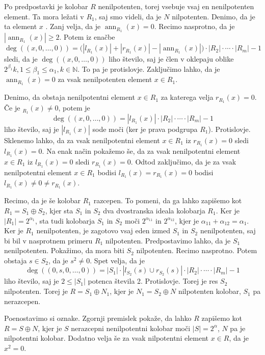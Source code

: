 \documentclass[a4paper, 12pt]{amsart}
\theoremstyle{definition} %
\theoremstyle{plain} %
\newcommand{\N}{\mathbb N}
\DeclareMathOperator{\ann}{ann}
\begin{document}
Po predpostavki je kolobar $R$ nenilpotenten, torej vsebuje vsaj en nenilpotenten element. Ta mora ležati v $R_1$, saj smo videli, da je $N$ nilpotenten. Denimo, da je ta element $x$ . Zanj velja, da je $\ann_{R_1}(x) = 0$. Recimo nasprotno, da je $|\ann_{R_1}(x)|\ge 2$. Potem iz enačbe 
$$
\deg ((x,0,\dots,0)) = \big( |l_{R_1}(x) | + |r_{R_1}(x)| - |\ann_{R_1}(x)| \big) \cdot |R_2| \cdot \cdots \cdot |R_m| - 1
$$
sledi, da je $\deg((x,0,\dots,0))$ liho število, saj je člen v oklepaju oblike $2^{\beta_1}k, 1\le \beta_1 \le \alpha_1, k\in \N$. To pa je protislovje. Zaključimo lahko, da je $\ann_{R_1}(x) = 0$ za vsak nenilpotenten element $x\in R_1$.

Denimo, da obstaja nenilpotentni element $x\in R_1$ za katerega velja $r_{R_1}(x) = 0$. Če je $_{R_1}(x) \neq 0$, potem je 
$$
\deg((x,0,\dots,0)) = |l_{R_1}(x)| \cdot |R_2| \cdot \cdots  \cdot |R_m| -1
$$  
liho število, saj je $|l_{R_1}(x)|$ sode moči (ker je prava podgrupa $R_1$). Protislovje. Sklenemo lahko, da za vsak nenilpotentni element $x\in R_1$ iz $r_{R_1}(x) = 0$ sledi $l_{R_1}(x) = 0$. Na enak način pokažemo še, da za vsak nenilpotentni element $x\in R_1$ iz $l_{R_1}(x) = 0$ sledi $r_{R_1}(x) = 0$. Odtod zaključimo, da je za vsak nenilpotentni element $x\in R_1$ bodisi $l_{R_1}(x) = r_{R_1}(x) = 0$ bodisi $l_{R_1}(x) \neq 0 \neq r_{R_1}(x)$.

Recimo, da je še kolobar $R_1$ razcepen. To pomeni, da ga lahko zapišemo kot $R_1 = S_1 \oplus S_2$, kjer sta $S_1$ in $S_2$ dva dvostranska ideala kolobarja $R_1$. Ker je $|R_1| = 2^{\alpha_1}$, sta tudi kolobarja $S_1$ in $S_2$ moči $2^{\alpha_{11}}$ in $2^{\alpha_{12}}$, kjer je $\alpha_{11} + \alpha_{12} = \alpha_1$. Ker je $R_1$ nenilpotenten, je zagotovo vsaj eden izmed $S_1$ in $S_2$ nenilpotenten, saj bi bil v nasprotnem primeru $R_1$ nilpotenten. Predpostavimo lahko, da je $S_1$ nenilpotenten. Pokažimo, da mora biti $S_2$ nilpotenten. Recimo nasprotno. Potem obstaja $s  \in S_2$, da je $s^2 \neq 0$. Spet velja, da je 
$$
\deg((0,s,0,\dots,0)) = |S_1|\cdot |l_{S_2}(s) \cup r_{S_2}(s)| \cdot |R_2| \cdot \cdots \cdot |R_m| - 1
$$
liho število, saj je $2\le |S_1|$ potenca števila 2. Protislovje. Torej je res $S_2$ nilpotenten. Torej je $R= S_1 \oplus N_1$, kjer je $N_1 = S_2\oplus N$ nilpotenten kolobar, $S_1$ pa nerazcepen.

Poenostavimo si oznake. Zgornji premislek pokaže, da lahko $R$ zapišemo kot $R = S\oplus N$, kjer je $S$ nerazcepni nenilpotentni kolobar moči $|S| = 2^{\alpha}$, $N$ pa je nilpotentni kolobar. Dodatno velja še za vsak nilpotentni element $x\in R$, da je $x^2 = 0$.
\end{document}
